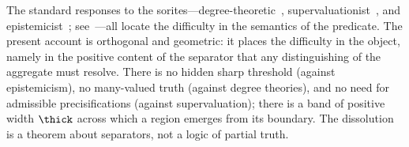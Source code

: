 \begin{remark}
\label{rem:vagueness}
The standard responses to the sorites---degree-theoretic~\citep{zadeh1965},
supervaluationist~\citep{fine1975,keefe2000}, and
epistemicist~\citep{williamson1994}; see~\citet{black1937,hyderaffman2018}---all
locate the difficulty in the semantics of the predicate. The present account is
orthogonal and geometric: it places the difficulty in the object, namely in the
positive content of the separator that any distinguishing of the aggregate must
resolve. There is no hidden sharp threshold (against epistemicism), no
many-valued truth (against degree theories), and no need for admissible
precisifications (against supervaluation); there is a band of positive width
$\thick$ across which a region emerges from its boundary. The dissolution is a
theorem about separators, not a logic of partial truth.
\end{remark}
